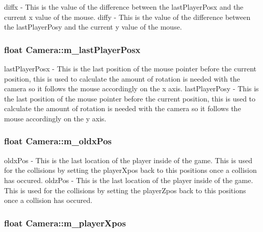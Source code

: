 diffx -\/ This is the value of the difference between the lastPlayerPosx and the current x value of the mouse. diffy -\/ This is the value of the difference between the lastPlayerPosy and the current y value of the mouse. \hypertarget{classCamera_a96dd9f9e56923783d8be6bb3b42456cf}{
\subsubsection[{m\_\-lastPlayerPosx}]{\setlength{\rightskip}{0pt plus 5cm}float {\bf Camera::m\_\-lastPlayerPosx}}}
\label{classCamera_a96dd9f9e56923783d8be6bb3b42456cf}


lastPlayerPosx -\/ This is the last position of the mouse pointer before the current position, this is used to calculate the amount of rotation is needed with the camera so it follows the mouse accordingly on the x axis. lastPlayerPosy -\/ This is the last position of the mouse pointer before the current position, this is used to calculate the amount of rotation is needed with the camera so it follows the mouse accordingly on the y axis. \hypertarget{classCamera_a26a53c2caa3c9eedf69b128b9280bd8f}{
\subsubsection[{m\_\-oldxPos}]{\setlength{\rightskip}{0pt plus 5cm}float {\bf Camera::m\_\-oldxPos}}}
\label{classCamera_a26a53c2caa3c9eedf69b128b9280bd8f}


oldxPos -\/ This is the last location of the player inside of the game. This is used for the collisions by setting the playerXpos back to this positions once a collision has occured. oldzPos -\/ This is the last location of the player inside of the game. This is used for the collisions by setting the playerZpos back to this positions once a collision has occured. \hypertarget{classCamera_adb4519feec6a1363662305b67a2cc486}{
\subsubsection[{m\_\-playerXpos}]{\setlength{\rightskip}{0pt plus 5cm}float {\bf Camera::m\_\-playerXpos}}}
\label{classCamera_adb4519feec6a1363662305b67a2cc486}


